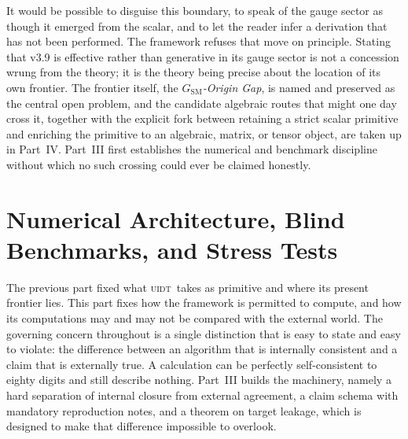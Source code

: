 \documentclass[12pt,a4paper,twoside]{article}
\theoremstyle{plain}
\theoremstyle{definition}
\theoremstyle{remark}
\newcommand{\UIDT}{\textsc{uidt}}
\begin{document}
\noindent It would be possible to disguise this boundary, to speak of the gauge sector as though it emerged from the scalar, and to let the reader infer a derivation that has not been performed. The framework refuses that move on principle. Stating that v3.9 is effective rather than generative in its gauge sector is not a concession wrung from the theory; it is the theory being precise about the location of its own frontier. The frontier itself, the \emph{$G_{\mathrm{SM}}$-Origin Gap}, is named and preserved as the central open problem, and the candidate algebraic routes that might one day cross it, together with the explicit fork between retaining a strict scalar primitive and enriching the primitive to an algebraic, matrix, or tensor object, are taken up in Part~IV. Part~III first establishes the numerical and benchmark discipline without which no such crossing could ever be claimed honestly.


\part{Numerical Architecture, Blind Benchmarks, and Stress Tests}
\label{part:numerical-architecture}

\noindent The previous part fixed what \UIDT\ takes as primitive and where its present frontier lies. This part fixes how the framework is permitted to compute, and how its computations may and may not be compared with the external world. The governing concern throughout is a single distinction that is easy to state and easy to violate: the difference between an algorithm that is internally consistent and a claim that is externally true. A calculation can be perfectly self-consistent to eighty digits and still describe nothing. Part~III builds the machinery, namely a hard separation of internal closure from external agreement, a claim schema with mandatory reproduction notes, and a theorem on target leakage, which is designed to make that difference impossible to overlook.
\end{document}

